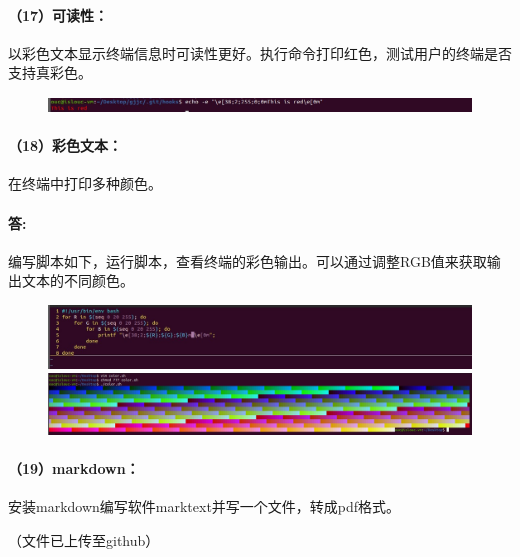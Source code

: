 \documentclass[a4paper, 12pt]{article}
\begin{document}
	\paragraph{（17）可读性：}
	以彩色文本显示终端信息时可读性更好。执行命令打印红色，测试用户的终端是否支持真彩色。
	
	\begin{figure}[H]
		\centering
		\includegraphics[width=1\textwidth]{036.jpg}
	\end{figure}
	
	\paragraph{（18）彩色文本：}	
	在终端中打印多种颜色。
	
	\paragraph{答:}
	编写脚本如下，运行脚本，查看终端的彩色输出。可以通过调整RGB值来获取输出文本的不同颜色。
	
	\begin{figure}[H]
		\centering
		\includegraphics[width=1\textwidth]{037.jpg}
		\includegraphics[width=1\textwidth]{038.jpg}
	\end{figure}
	
	\paragraph{（19）markdown：}
	安装markdown编写软件marktext并写一个文件，转成pdf格式。
	
	（文件已上传至github）
\end{document}
